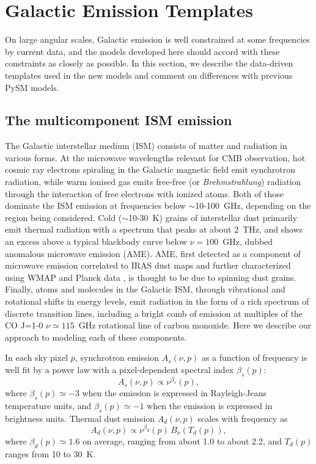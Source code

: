 \section{Galactic Emission Templates} \label{sec:templates}
On large angular scales, Galactic emission is well constrained at some frequencies by current data, and the models developed here should accord with these constraints as closely as possible. In this section, we describe the data-driven templates used in the new models and comment on differences with previous PySM models.

\subsection{The multicomponent ISM emission}

The Galactic interstellar medium (ISM) consists of matter and radiation in various forms. At the microwave wavelengths relevant for CMB observation, hot cosmic ray electrons spiraling in the Galactic magnetic field emit synchrotron radiation, while warm ionised gas emits free-free (or \emph{Brehmstrahlung}) radiation through the interaction of free electrons with ionized atoms. Both of those dominate the ISM emission at frequencies below $\sim$10-100~GHz, depending on the region being considered.  
Cold ($\sim$10-30~K) grains of interstellar dust primarily emit thermal radiation with a spectrum that peaks at about 2~THz, and shows an excess above a typical blackbody curve below $\nu=100$~GHz, dubbed anomalous microwave emission (AME). AME, first detected as a component of microwave emission correlated to IRAS dust maps \citep{1996ApJ...464L...5K,1997ApJ...486L..23L} and further characterized using WMAP and Planck data \citep{planck2011-7.2}, is thought to be due to spinning dust grains. Finally, atoms and molecules in the Galactic ISM, through vibrational and rotational shifts in energy levels, emit radiation in the form of a rich spectrum of discrete transition lines, including a bright comb of emission at multiples of the CO J=1-0 $\nu \simeq 115$~GHz rotational line of carbon monoxide. Here we describe our approach to modeling each of these components. 

In each sky pixel $p$, synchrotron emission $A_s(\nu,p)$ as a function of frequency is well fit by a power law with a pixel-dependent spectral index $\beta_s(p)$:
\begin{equation}
    A_s(\nu,p) \propto \nu^{\beta_s}(p),
\end{equation}
where $\beta_s(p) \simeq -3$ when the emission is expressed in Rayleigh-Jeans temperature units, and $\beta_s(p) \simeq -1$ when the emission is expressed in brightness units. Thermal dust emission $A_d(\nu,p)$ scales with frequency as
\begin{equation}
    A_d(\nu,p) \propto \nu^{\beta_d}(p) \, B_\nu(T_d(p)),
    \label{eq:dust-emission-law}
\end{equation}
where $\beta_d(p) \simeq 1.6$ on average, ranging from about 1.0 to about 2.2, and $T_d(p)$ ranges from 10 to 30~K.

